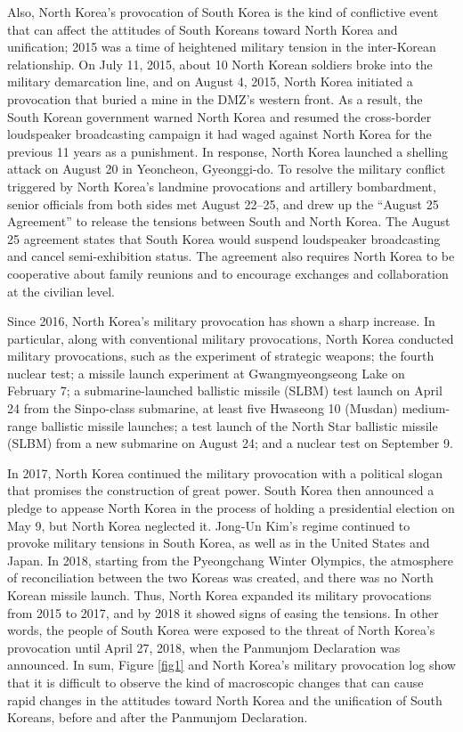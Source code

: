 \documentclass[letterpaper,9pt,twocolumn,twoside,]{pinp}
\begin{document}
Also, North Korea's provocation of South Korea is the kind of
conflictive event that can affect the attitudes of South Koreans toward
North Korea and unification; 2015 was a time of heightened military
tension in the inter-Korean relationship. On July 11, 2015, about 10
North Korean soldiers broke into the military demarcation line, and on
August 4, 2015, North Korea initiated a provocation that buried a mine
in the DMZ's western front. As a result, the South Korean government
warned North Korea and resumed the cross-border loudspeaker broadcasting
campaign it had waged against North Korea for the previous 11 years as a
punishment. In response, North Korea launched a shelling attack on
August 20 in Yeoncheon, Gyeonggi-do. To resolve the military conflict
triggered by North Korea's landmine provocations and artillery
bombardment, senior officials from both sides met August 22--25, and
drew up the ``August 25 Agreement'' to release the tensions between
South and North Korea. The August 25 agreement states that South Korea
would suspend loudspeaker broadcasting and cancel semi-exhibition
status. The agreement also requires North Korea to be cooperative about
family reunions and to encourage exchanges and collaboration at the
civilian level.

Since 2016, North Korea's military provocation has shown a sharp
increase. In particular, along with conventional military provocations,
North Korea conducted military provocations, such as the experiment of
strategic weapons; the fourth nuclear test; a missile launch experiment
at Gwangmyeongseong Lake on February 7; a submarine-launched ballistic
missile (SLBM) test launch on April 24 from the Sinpo-class submarine,
at least five Hwaseong 10 (Musdan) medium-range ballistic missile
launches; a test launch of the North Star ballistic missile (SLBM) from
a new submarine on August 24; and a nuclear test on September 9.

In 2017, North Korea continued the military provocation with a political
slogan that promises the construction of great power. South Korea then
announced a pledge to appease North Korea in the process of holding a
presidential election on May 9, but North Korea neglected it. Jong-Un
Kim's regime continued to provoke military tensions in South Korea, as
well as in the United States and Japan. In 2018, starting from the
Pyeongchang Winter Olympics, the atmosphere of reconciliation between
the two Koreas was created, and there was no North Korean missile
launch. Thus, North Korea expanded its military provocations from 2015
to 2017, and by 2018 it showed signs of easing the tensions. In other
words, the people of South Korea were exposed to the threat of North
Korea's provocation until April 27, 2018, when the Panmunjom Declaration
was announced. In sum, Figure \ref{fig1} and North Korea's military
provocation log show that it is difficult to observe the kind of
macroscopic changes that can cause rapid changes in the attitudes toward
North Korea and the unification of South Koreans, before and after the
Panmunjom Declaration.
\end{document}
